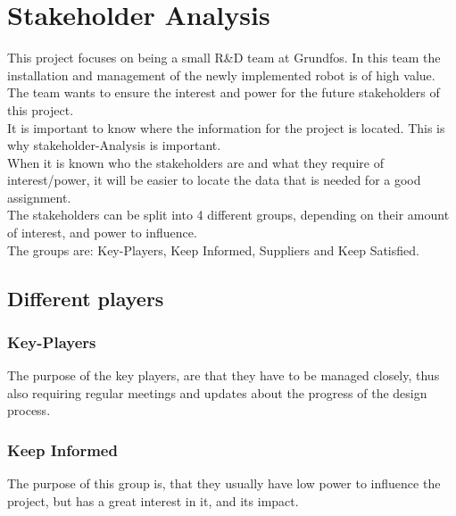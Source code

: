 \chapter{Stakeholder Analysis} \label{ch:Stakeholder Analysis}

This project focuses on being a small R\&D team at Grundfos. In this team the installation and management of the newly implemented robot is of high value.\\
The team wants to ensure the interest and power for the future stakeholders of this project.\\
It is important to know where the information for the project is located. This is why stakeholder-Analysis is important.\\
When it is known who the stakeholders are and what they require of interest/power, it will be easier to locate the data that is needed for a good assignment.\\


The stakeholders can be split into 4 different groups, depending on their amount of interest, and power to influence.\\
The groups are: Key-Players, Keep Informed, Suppliers and Keep Satisfied.\\
\section{Different players}

\subsection{Key-Players}
The purpose of the key players, are that they have to be managed closely, thus also requiring regular meetings and updates about the progress of the design process.\\

\subsection{Keep Informed}
The purpose of this group is, that they usually have low power to influence the project, but has a great interest in it, and its impact.\\

